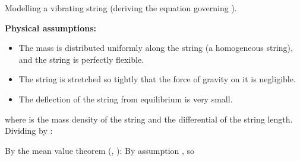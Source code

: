 \EMhold


\begin{EMunit}

Modelling a vibrating string (deriving the equation governing ).

\textbf{Physical assumptions:}

\begin{itemize}
\tightlist
\item
  The mass is distributed uniformly along the string (a homogeneous string), and the string is perfectly flexible.
\item
  The string is stretched so tightly that the force of gravity on it is negligible.
\item
  The deflection of the string from equilibrium is very small.
\end{itemize}


\end{EMunit}

\begin{EMunit}

where \EMim{\rho} is the mass density of the string and  the differential of the string length. Dividing by :

By the mean value theorem (, ):
By assumption , so

\end{EMunit}


